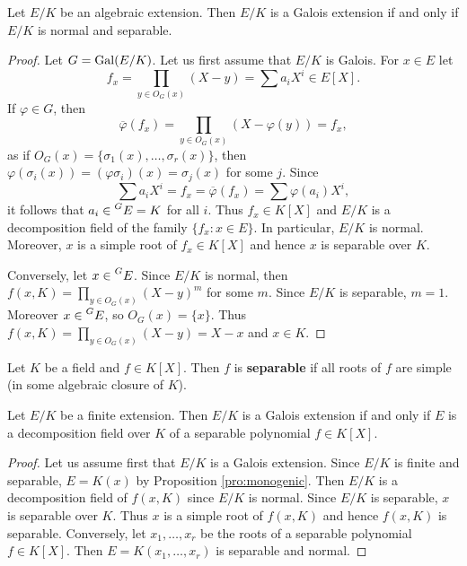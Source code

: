 \begin{proposition}
\label{pro:normal+separable}
    Let $E/K$ be an algebraic extension. Then $E/K$ is a Galois extension
    if and only if $E/K$ is normal and separable. 
\end{proposition}

\begin{proof}
    Let $G=\operatorname{Gal}(E/K)$. Let us first assume that $E/K$ is Galois. For $x\in E$ let 
    \[
    f_x=\prod_{y\in O_G(x)}(X-y)=\sum a_iX^i\in E[X].
    \]
    If $\varphi\in G$, then 
    \[
    \overline{\varphi}(f_x)=\prod_{y\in O_G(x)}(X-\varphi(y))=f_x,
    \]
    as if $O_G(x)=\{\sigma_1(x),\dots,\sigma_r(x)\}$, then 
    $\varphi(\sigma_i(x))=(\varphi\sigma_i)(x)=\sigma_j(x)$ for some $j$. 
    Since 
    \[
    \sum a_iX^i=f_x=\overline{\varphi}(f_x)=\sum\varphi(a_i)X^i,
    \]
    it follows that $a_i\in\prescript{G}{}{E}=K$ for all $i$. 
    Thus $f_x\in K[X]$
    and $E/K$ is a decomposition field of the family $\{f_x:x\in E\}$. In particular, 
    $E/K$ is normal. Moreover, $x$ is a simple root of $f_x\in K[X]$ and hence
    $x$ is separable over $K$. 

    Conversely, let $x\in \prescript{G}{}{E}$. Since $E/K$ is normal, then 
    $f(x,K)=\prod_{y\in O_G(x)}(X-y)^m$ for some $m$.
    Since $E/K$ is separable, 
    $m=1$.
    Moreover $x\in \prescript{G}{}{E}$, so $O_G(x)=\{x\}$.
    Thus $f(x,K)=\prod_{y\in O_G(x)}(X-y)=X-x$ and $x\in K$. 
\end{proof}

\begin{definition}
Let $K$ be a field and $f\in K[X]$. Then $f$ is \textbf{separable}
if all roots of $f$ are simple (in some algebraic closure of $K$). 
\end{definition}

\begin{proposition}
    Let $E/K$ be a finite extension. Then $E/K$ is a Galois extension 
    if and only if $E$ is a decomposition field over $K$ 
    of a separable polynomial $f\in K[X]$. 
\end{proposition}

\begin{proof}
    Let us assume first that $E/K$ is a Galois extension. Since
    $E/K$ is finite and separable, $E=K(x)$ by Proposition \ref{pro:monogenic}. 
    Then $E/K$ is a decomposition field of $f(x,K)$ since
    $E/K$ is normal. Since $E/K$ is separable, $x$ is separable over $K$. Thus $x$ is 
    a simple root of $f(x,K)$ and hence $f(x,K)$ is separable. 
    Conversely, let $x_1,\dots,x_r$ be the roots of a separable polynomial $f\in K[X]$.
    Then $E=K(x_1,\dots,x_r)$ is separable and normal.  
\end{proof}

